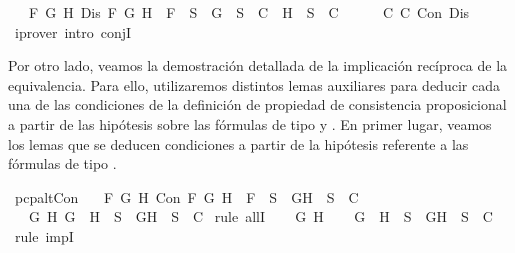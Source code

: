 \begin{isabellebody}
\ \ {\isasymand}\ {\isacharparenleft}{\isasymforall}F\ G\ H{\isachardot}\ Dis\ F\ G\ H\ {\isasymlongrightarrow}\ F\ {\isasymin}\ S\ {\isasymlongrightarrow}\ {\isacharbraceleft}G{\isacharbraceright}\ {\isasymunion}\ S\ {\isasymin}\ C\ {\isasymor}\ {\isacharbraceleft}H{\isacharbraceright}\ {\isasymunion}\ S\ {\isasymin}\ C{\isacharparenright}{\isachardoublequoteclose}\isanewline
\ \ \ \ \isamarkupfalse%
\ C{}\ C{}\ Con\ Dis\ \isamarkupfalse%
\ {\isacharparenleft}iprover\ intro{\isacharcolon}\ conjI{\isacharparenright}\isanewline
{}\isamarkupfalse%
%
\endisatagproof
{\isafoldproof}%
%
\isadelimproof
%
\endisadelimproof
%
\begin{isamarkuptext}%
Por otro lado, veamos la demostración detallada de la implicación recíproca de la
  equivalencia. Para ello, utilizaremos distintos lemas auxiliares para deducir cada una de las 
  condiciones de la definición de propiedad de consistencia proposicional a partir de las
  hipótesis sobre las fórmulas de tipo \isa{{\isasymalpha}} y \isa{{\isasymbeta}}. En primer lugar, veamos los lemas que se deducen
  condiciones a partir de la hipótesis referente a las fórmulas de tipo \isa{{\isasymalpha}}.%
\end{isamarkuptext}\isamarkuptrue%
\isamarkupfalse%
\ pcp{\isacharunderscore}alt{}Con{}{\isacharcolon}\isanewline
\ \ \ {\isachardoublequoteopen}{\isasymforall}F\ G\ H{\isachardot}\ Con\ F\ G\ H\ {\isasymlongrightarrow}\ F\ {\isasymin}\ S\ {\isasymlongrightarrow}\ {\isacharbraceleft}G{\isacharcomma}H{\isacharbraceright}\ {\isasymunion}\ S\ {\isasymin}\ C{\isachardoublequoteclose}\isanewline
\ \ \ {\isachardoublequoteopen}{\isasymforall}G\ H{\isachardot}\ G\ \isactrlbold {\isasymand}\ H\ {\isasymin}\ S\ {\isasymlongrightarrow}\ {\isacharbraceleft}G{\isacharcomma}H{\isacharbraceright}\ {\isasymunion}\ S\ {\isasymin}\ C{\isachardoublequoteclose}\isanewline
%
\isadelimproof
%
\endisadelimproof
%
\isatagproof
{}\isamarkupfalse%
\ {\isacharparenleft}rule\ allI{\isacharparenright}{\isacharplus}\isanewline
\ \ \isamarkupfalse%
\ G\ H\isanewline
\ \ \isamarkupfalse%
\ {\isachardoublequoteopen}G\ \isactrlbold {\isasymand}\ H\ {\isasymin}\ S\ {\isasymlongrightarrow}\ {\isacharbraceleft}G{\isacharcomma}H{\isacharbraceright}\ {\isasymunion}\ S\ {\isasymin}\ C{\isachardoublequoteclose}\isanewline
\ \ \isamarkupfalse%
\ {\isacharparenleft}rule\ impI{\isacharparenright}\isanewline

\end{isabellebody}
